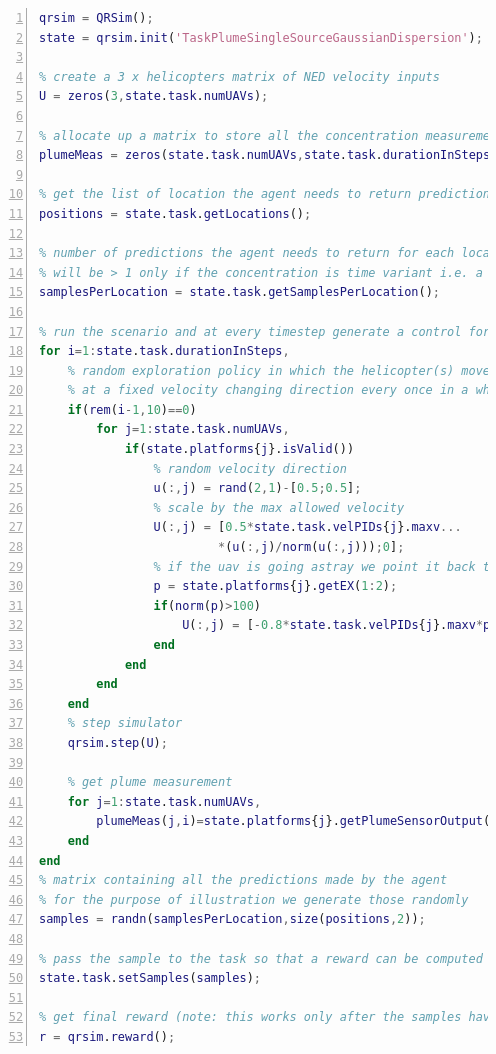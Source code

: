 \documentclass[a4paper,11pt]{report}
\begin{document}
\begin{lstlisting}[float=ht!bp,caption=main\_plume.m,language=Matlab,frame=lines,label=lst:mpl,numbers=left,basicstyle=\small]
% create simulator object and load task parameters
qrsim = QRSim();
state = qrsim.init('TaskPlumeSingleSourceGaussianDispersion');

% create a 3 x helicopters matrix of NED velocity inputs
U = zeros(3,state.task.numUAVs);

% allocate up a matrix to store all the concentration measurements
plumeMeas = zeros(state.task.numUAVs,state.task.durationInSteps);

% get the list of location the agent needs to return predictions at.
positions = state.task.getLocations();

% number of predictions the agent needs to return for each location,
% will be > 1 only if the concentration is time variant i.e. a puff model
samplesPerLocation = state.task.getSamplesPerLocation();

% run the scenario and at every timestep generate a control for each uav
for i=1:state.task.durationInSteps,    
    % random exploration policy in which the helicopter(s) moves around
    % at a fixed velocity changing direction every once in a while 
    if(rem(i-1,10)==0)
        for j=1:state.task.numUAVs,
            if(state.platforms{j}.isValid())                
                % random velocity direction
                u(:,j) = rand(2,1)-[0.5;0.5];            
                % scale by the max allowed velocity
                U(:,j) = [0.5*state.task.velPIDs{j}.maxv...
                         *(u(:,j)/norm(u(:,j)));0];                                
                % if the uav is going astray we point it back to the center
                p = state.platforms{j}.getEX(1:2);
                if(norm(p)>100)
                    U(:,j) = [-0.8*state.task.velPIDs{j}.maxv*p/norm(p);0];
                end    
            end
        end
    end    
    % step simulator
    qrsim.step(U);

    % get plume measurement
    for j=1:state.task.numUAVs,
        plumeMeas(j,i)=state.platforms{j}.getPlumeSensorOutput();
    end
end
% matrix containing all the predictions made by the agent
% for the purpose of illustration we generate those randomly 
samples = randn(samplesPerLocation,size(positions,2));

% pass the sample to the task so that a reward can be computed
state.task.setSamples(samples);

% get final reward (note: this works only after the samples have been set!).
r = qrsim.reward();
\end{lstlisting}
\end{document}
